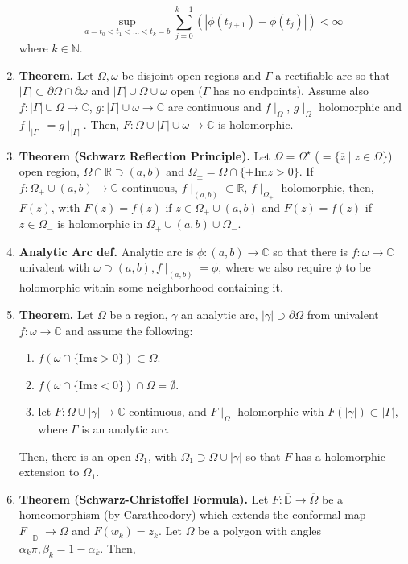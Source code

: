 \begin{enumerate}
	$$
	\sup_{a=t_0<t_1<\dots<t_k=b} \sum_{j=0}^{k-1} \left(|\phi(t_{j+1}) - \phi(t_j)|\right) < \infty
	$$
	where $k \in \mathbb{N}$. 
	\item \textbf{Theorem. } Let $\Omega,\omega$ be disjoint open regions and $\Gamma$ a rectifiable arc so that $|\Gamma| \subset \partial \Omega \cap \partial \omega$ and $|\Gamma| \cup \Omega \cup \omega$ open ($\Gamma$ has no endpoints). Assume also $f: |\Gamma| \cup \Omega \to \mathbb{C}$, $g: |\Gamma| \cup \omega \to \mathbb{C}$ are continuous and $f\mid_\Omega$, $g\mid_\Omega$ holomorphic and $f\mid_{|\Gamma|} = g\mid_{|\Gamma|}$. Then, $F: \Omega \cup |\Gamma| \cup \omega \to \mathbb{C}$ is holomorphic.
	\item \textbf{Theorem (Schwarz Reflection Principle). } Let $\Omega = \Omega^{\star}$ ($=\{\overline{z} \mid z \in \Omega\}$) open region, $\Omega \cap \mathbb{R} \supset (a,b)$ and $\Omega_{\pm} = \Omega \cap \{\pm \textrm{Im}z > 0\}$. If $f: \Omega_+ \cup (a,b) \to \mathbb{C}$ continuous, $f\mid_{(a,b)} \subset \mathbb{R}$, $f\mid_{\Omega_+}$ holomorphic, then, $F(z)$, with $F(z)=f(z)$ if $z \in \Omega_+ \cup (a,b)$ and $F(z)=\overline{f(\overline{z})}$ if $z \in \Omega_-$ is holomorphic in $\Omega_+ \cup (a,b) \cup \Omega_-$. 
	\item \textbf{Analytic Arc def. } Analytic arc is $\phi: (a,b) \to \mathbb{C}$ so that there is $f: \omega \to \mathbb{C}$ univalent with $\omega \supset (a,b), f \mid_{(a,b)} = \phi$, where we also require $\phi$ to be holomorphic within some neighborhood containing it. 
	\item \textbf{Theorem. } Let $\Omega$ be a region, $\gamma$ an analytic arc, $|\gamma| \supset \partial \Omega$ from univalent $f: \omega \to \mathbb{C}$ and assume the following: 
	\begin{enumerate}	
		\item $f(\omega \cap \{\textrm{Im}z > 0\}) \subset \Omega$. 
		\item $f(\omega \cap \{\textrm{Im}z < 0\}) \cap \Omega = \emptyset$. 
		\item let $F: \Omega \cup |\gamma| \to \mathbb{C}$ continuous, and $F \mid_\Omega$ holomorphic with $F(|\gamma|) \subset |\Gamma|$, where $\Gamma$ is an analytic arc. 
	\end{enumerate} 
	Then, there is an open $\Omega_1$, with $\Omega_1 \supset \Omega \cup |\gamma|$ so that $F$ has a holomorphic extension to $\Omega_1$. 
	\item \textbf{Theorem (Schwarz-Christoffel Formula). } Let $F: \overline{\mathbb{D}} \to \overline{\Omega}$ be a homeomorphism (by Caratheodory) which extends the conformal map $F \mid_{\mathbb{D}} \to \Omega$ and $F(w_k) = z_k$. Let $\overline{\Omega}$ be a polygon with angles $\alpha_k\pi, \beta_k = 1-\alpha_k$. Then, 

\end{enumerate}
